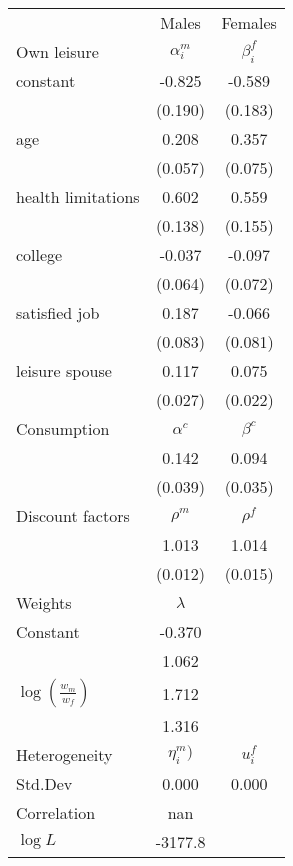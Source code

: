 \begin{tabular}{lcc} 
\hline\hline 
 & Males & Females \\ 
Own leisure & $\alpha_{i}^{m}$ & $\beta_{i}^{f}$ \\ 
constant & -0.825 & -0.589 \\ 
 & (0.190) & (0.183) \\ 
age & 0.208 & 0.357 \\ 
 & (0.057) & (0.075) \\ 
health limitations & 0.602 & 0.559 \\ 
 & (0.138) & (0.155) \\ 
college & -0.037 & -0.097 \\ 
 & (0.064) & (0.072) \\ 
satisfied job & 0.187 & -0.066 \\ 
 & (0.083) & (0.081) \\ 
leisure spouse & 0.117 & 0.075 \\ 
 & (0.027) & (0.022) \\ 
Consumption & $\alpha^{c}$ & $\beta^{c}$ \\ 
 & 0.142 & 0.094 \\ 
 & (0.039) & (0.035) \\ 
Discount factors & $\rho^m$ & $\rho^f$ \\ 
 & 1.013 & 1.014 \\ 
 & (0.012) & (0.015) \\ 
Weights & $\lambda$ &  \\ 
Constant & -0.370 &  \\ 
 & 1.062 &  \\ 
$\log(\frac{w_m}{w_f})$ & 1.712 &  \\ 
 & 1.316 &  \\ 
Heterogeneity & $\eta_i^m)$ & $
u_i^f$ \\ 
Std.Dev & 0.000 & 0.000 \\ 
Correlation & nan &  \\ 
\hline 
$\log L$ & -3177.8 & \\ 
\hline \hline 
\end{tabular} 
